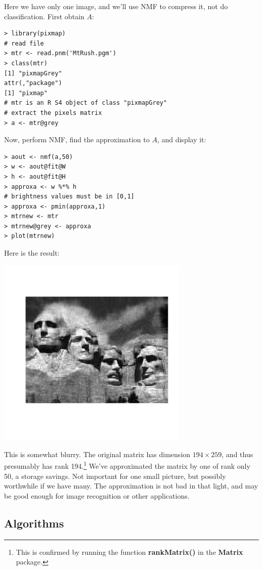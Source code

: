 Here we have only one image, and we'll use NMF to compress it, not do
classification.  First obtain $A$:

\begin{lstlisting}
> library(pixmap) 
# read file
> mtr <- read.pnm('MtRush.pgm') 
> class(mtr)
[1] "pixmapGrey"
attr(,"package")
[1] "pixmap"
# mtr is an R S4 object of class "pixmapGrey"
# extract the pixels matrix
> a <- mtr@grey
\end{lstlisting}

Now, perform NMF, find the approximation to $A$, and display it:

\begin{lstlisting}
> aout <- nmf(a,50)
> w <- aout@fit@W
> h <- aout@fit@H
> approxa <- w %*% h
# brightness values must be in [0,1]
> approxa <- pmin(approxa,1) 
> mtrnew <- mtr
> mtrnew@grey <- approxa 
> plot(mtrnew) 
\end{lstlisting}

Here is the result:

\includegraphics[width=3.6in]{Images/MtRush50.png}

This is somewhat blurry.  The original matrix has dimension $194
\times 259$, and thus presumably has rank 194.\footnote{This is
confirmed by running the function {\bf rankMatrix()} in the {\bf Matrix}
package.} We've approximated the matrix by one of rank only 50, a
storage savings.  Not important for one small picture, but possibly
worthwhile if we have many. The approximation is not bad in that light,
and may be good enough for image recognition or other applications.

\subsection{Algorithms}

